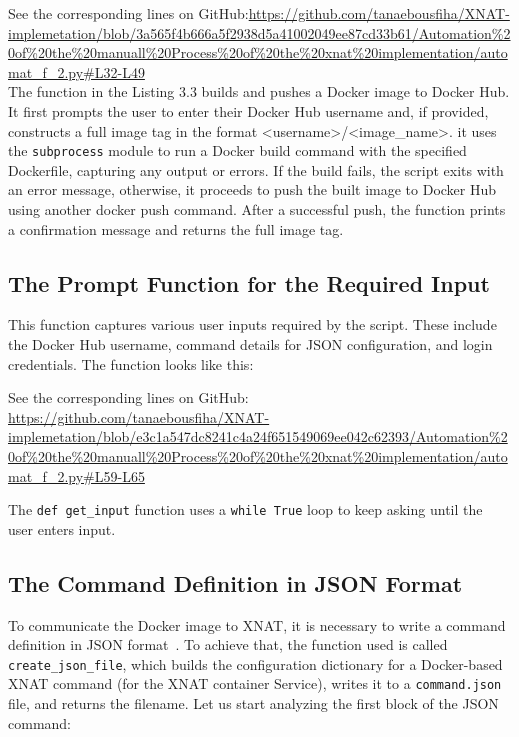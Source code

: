 \noindent\footnotesize See the corresponding lines on GitHub:\url{https://github.com/tanaebousfiha/XNAT-implemetation/blob/3a565f4b666a5f2938d5a41002049ee87cd33b61/Automation%20of%20the%20manuall%20Process%20of%20the%20xnat%20implementation/automat_f_2.py#L32-L49}
\normalsize
\\
The function in the Listing 3.3 builds and pushes a Docker image to Docker Hub. It first prompts the user to enter their Docker Hub username and, if provided, constructs a full image tag in the format <username>/<image\_name>. it uses the \texttt{subprocess} module to run a Docker build command with the specified Dockerfile, capturing any output or errors. If the build fails, the script exits with an error message, otherwise, it proceeds to push the built image to Docker Hub using another docker push command. After a successful push, the function prints a confirmation message and returns the full image tag.



\subsection{The Prompt Function for the Required Input}

This function captures various user inputs required by the script. These include the Docker Hub username, command details for JSON configuration, and login credentials.
The function looks like this:
 


\noindent\footnotesize See the corresponding lines on GitHub:\url{ https://github.com/tanaebousfiha/XNAT-implemetation/blob/e3c1a547dc8241c4a24f651549069ee042c62393/Automation%20of%20the%20manuall%20Process%20of%20the%20xnat%20implementation/automat_f_2.py#L59-L65}
\normalsize

The \texttt{def get\_input} function uses a \texttt{while True} loop to keep asking until the user enters input.

\subsection{The Command Definition in JSON Format}

To communicate the Docker image to XNAT, it is necessary to write a command definition in JSON format~\cite{JSONCommand}.
To achieve that, the function used is called \texttt{create\_json\_file}, which builds the configuration dictionary for a Docker-based XNAT command (for the XNAT container Service), writes it to a \texttt{command.json} file, and returns the filename.
Let us start analyzing the first block of the JSON command:



